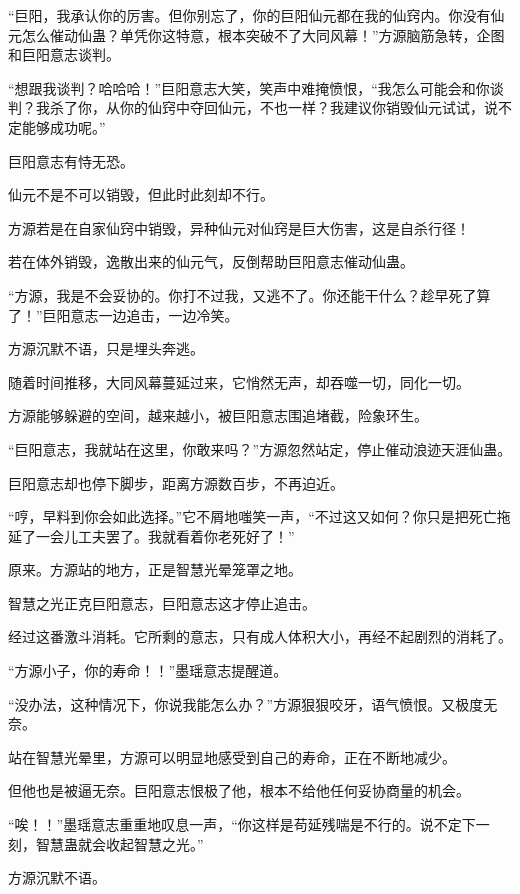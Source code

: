 
\begin{this_body}

“巨阳，我承认你的厉害。但你别忘了，你的巨阳仙元都在我的仙窍内。你没有仙元怎么催动仙蛊？单凭你这特意，根本突破不了大同风幕！”方源脑筋急转，企图和巨阳意志谈判。

“想跟我谈判？哈哈哈！”巨阳意志大笑，笑声中难掩愤恨，“我怎么可能会和你谈判？我杀了你，从你的仙窍中夺回仙元，不也一样？我建议你销毁仙元试试，说不定能够成功呢。”

巨阳意志有恃无恐。

仙元不是不可以销毁，但此时此刻却不行。

方源若是在自家仙窍中销毁，异种仙元对仙窍是巨大伤害，这是自杀行径！

若在体外销毁，逸散出来的仙元气，反倒帮助巨阳意志催动仙蛊。

“方源，我是不会妥协的。你打不过我，又逃不了。你还能干什么？趁早死了算了！”巨阳意志一边追击，一边冷笑。

方源沉默不语，只是埋头奔逃。

随着时间推移，大同风幕蔓延过来，它悄然无声，却吞噬一切，同化一切。

方源能够躲避的空间，越来越小，被巨阳意志围追堵截，险象环生。

“巨阳意志，我就站在这里，你敢来吗？”方源忽然站定，停止催动浪迹天涯仙蛊。

巨阳意志却也停下脚步，距离方源数百步，不再迫近。

“哼，早料到你会如此选择。”它不屑地嗤笑一声，“不过这又如何？你只是把死亡拖延了一会儿工夫罢了。我就看着你老死好了！”

原来。方源站的地方，正是智慧光晕笼罩之地。

智慧之光正克巨阳意志，巨阳意志这才停止追击。

经过这番激斗消耗。它所剩的意志，只有成人体积大小，再经不起剧烈的消耗了。

“方源小子，你的寿命！！”墨瑶意志提醒道。

“没办法，这种情况下，你说我能怎么办？”方源狠狠咬牙，语气愤恨。又极度无奈。

站在智慧光晕里，方源可以明显地感受到自己的寿命，正在不断地减少。

但他也是被逼无奈。巨阳意志恨极了他，根本不给他任何妥协商量的机会。

“唉！！”墨瑶意志重重地叹息一声，“你这样是苟延残喘是不行的。说不定下一刻，智慧蛊就会收起智慧之光。”

方源沉默不语。


\end{this_body}
